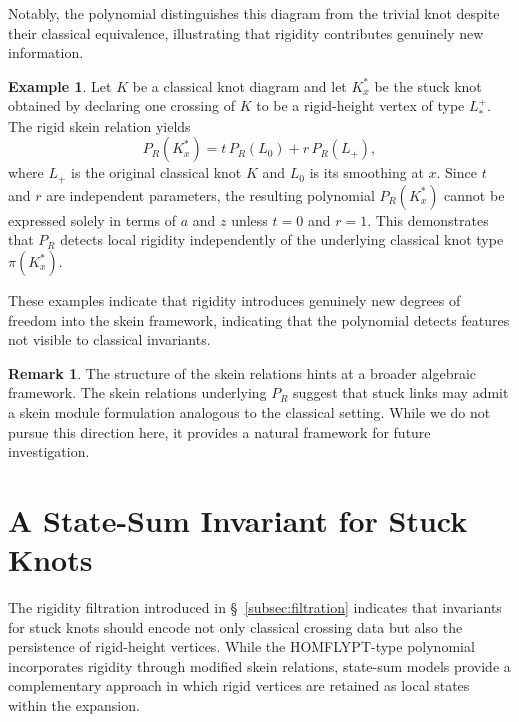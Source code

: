 \documentclass[11pt,a4paper]{article}
\theoremstyle{plain}
\theoremstyle{definition}
\newtheorem{example}[theorem]{Example}
\newtheorem{remark}[theorem]{Remark}
\begin{document}
Notably, the polynomial distinguishes this diagram from the trivial knot despite their classical equivalence, illustrating that rigidity contributes genuinely new information.

\begin{example}
Let $K$ be a classical knot diagram and let $K_x^\ast$ be the stuck knot obtained by declaring one crossing of $K$ to be a rigid-height vertex of type $L_{\ast}^{+}$. The rigid skein relation yields
\[
P_R(K_x^\ast) = t\,P_R(L_0) + r\,P_R(L_+),
\]
where $L_+$ is the original classical knot $K$ and $L_0$ is its smoothing at $x$. Since $t$ and $r$ are independent parameters, the resulting polynomial $P_R(K_x^\ast)$ cannot be expressed solely in terms of $a$ and $z$ unless $t=0$ and $r=1$. This demonstrates that $P_R$ detects local rigidity independently of the underlying classical knot type $\pi(K_x^\ast)$.
\end{example}




These examples indicate that rigidity introduces genuinely new degrees of freedom into the skein framework, indicating that the polynomial detects features not visible to classical invariants.

\begin{remark}
The structure of the skein relations hints at a broader algebraic framework. The skein relations underlying $P_R$ suggest that stuck links may admit a skein module formulation analogous to the classical setting. While we do not pursue this direction here, it provides a natural framework for future investigation.
\end{remark}




\section{A State-Sum Invariant for Stuck Knots}\label{sec:KaufBr}

The rigidity filtration introduced in \S~\ref{subsec:filtration} indicates that invariants for stuck knots should encode not only classical crossing data but also the persistence of rigid-height vertices. While the HOMFLYPT-type polynomial incorporates rigidity through modified skein relations, state-sum models provide a complementary approach in which rigid vertices are retained as local states within the expansion.
\end{document}
